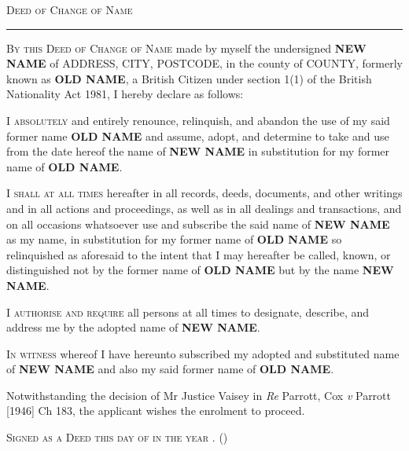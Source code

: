\documentclass[10pt, twoside, a4paper]{article}
\newcommand{\city}{CITY}
\newcommand{\county}{COUNTY}
\newcommand{\newname}{\textbf{NEW NAME}}
\newcommand{\oldname}{\textbf{OLD NAME}}
\newcommand{\postcode}{POSTCODE}
\newcommand{\streetaddress}{ADDRESS}
\begin{document}

{
	\centering
	\LARGE
	\scshape
	Deed of Change of Name
	\vspace{10pt}
	\hrule
	\par
}

\vspace{30pt}

\textsc{By this Deed of Change of Name} made by myself the undersigned
\newname{} of \streetaddress{}, \city{}, \postcode{}, in the county of
\county{}, formerly known as \oldname{}, a British Citizen under section 1(1)
of the British Nationality Act 1981, I hereby declare as follows:

\vspace{20pt}

\textsc{I absolutely} and entirely renounce, relinquish, and abandon the use of
my said former name \oldname{} and assume, adopt, and determine to take and use
from the date hereof the name of \newname{} in substitution for my former name
of \oldname{}.

\vspace{20pt}

\textsc{I shall at all times} hereafter in all records, deeds, documents, and
other writings and in all actions and proceedings, as well as in all dealings
and transactions, and on all occasions whatsoever use and subscribe the said
name of \newname{} as my name, in substitution for my former name of \oldname{}
so relinquished as aforesaid to the intent that I may hereafter be called,
known, or distinguished not by the former name of \oldname{} but by the name
\newname{}.

\vspace{20pt}

\textsc{I authorise and require} all persons at all times to designate,
describe, and address me by the adopted name of \newname{}.

\vspace{20pt}

\textsc{In witness} whereof I have hereunto subscribed my adopted and
substituted name of \newname{} and also my said former name of \oldname{}.

Notwithstanding the decision of Mr Justice Vaisey in \textit{Re} Parrott, Cox
\textit{v} Parrott [1946] Ch 183, the applicant wishes the enrolment to
proceed.

\textsc{Signed as a Deed this \nth{\the\day} day of \monthname{} in the year
{\the\year}. (\isodate{\today})}
\end{document}
